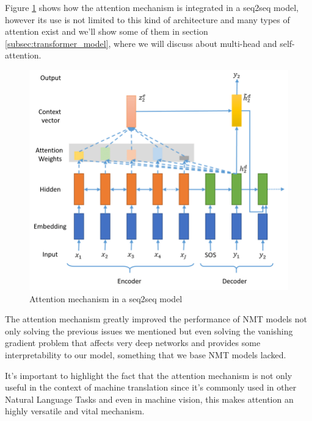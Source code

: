 Figure \ref{fig:attention_mechanism} shows how the attention mechanism is integrated in a seq2seq model, however its use is not limited to this kind of architecture and many types of attention exist and we'll show some of them in section \ref{subsec:transformer_model}, where we will discuss about multi-head and self-attention.
\begin{figure}[H]%
    \centering
    \includegraphics[width=0.68\linewidth]{images/attention_mechanism_2.png}
    \caption{Attention mechanism in a seq2seq model}
    \label{fig:attention_mechanism}
\end{figure}
The attention mechanism greatly improved the performance of NMT models not only solving the previous issues we mentioned but even solving the vanishing gradient problem that affects very deep networks and provides some interpretability to our model, something that we base NMT models lacked.
\vspace{3mm}

It's important to highlight the fact that the attention mechanism is not only useful in the context of machine translation since it's commonly used in other Natural Language Tasks and even in machine vision, this makes attention an highly versatile and vital mechanism.
